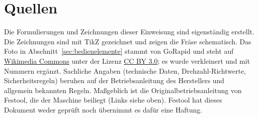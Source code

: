 \documentclass{\basedir/fablab-document}
\begin{document}
	\section{Quellen}
	Die Formulierungen und Zeichnungen dieser Einweisung sind eigenständig erstellt. Die Zeichnungen sind mit TikZ gezeichnet und zeigen die Fräse schematisch. Das Foto in Abschnitt~\ref{sec:bedienelemente} stammt von GoRapid und steht auf \href{https://commons.wikimedia.org/wiki/File:Oberfraese.jpg}{Wikimedia Commons} unter der Lizenz \href{https://creativecommons.org/licenses/by/3.0/}{CC BY 3.0}; es wurde verkleinert und mit Nummern ergänzt. Sachliche Angaben (technische Daten, Drehzahl-Richtwerte, Sicherheitsregeln) beruhen auf der Betriebsanleitung des Herstellers und allgemein bekannten Regeln. Maßgeblich ist die Originalbetriebsanleitung von Festool, die der Maschine beiliegt (Links siehe oben). Festool hat dieses Dokument weder geprüft noch übernimmt es dafür eine Haftung.

\end{document}

